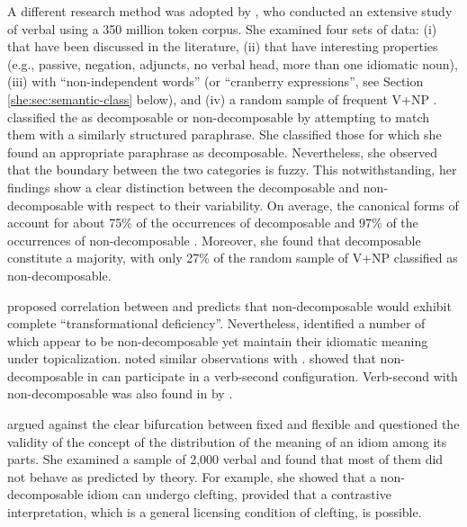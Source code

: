 \documentclass[output=paper]{langsci/langscibook}
\begin{document}
A different research method was adopted by \citet{riehemann01}, who conduct\-ed an extensive study of verbal  using
a 350 million token corpus. She examined four sets of data: (i) 
that have been discussed in the literature, (ii)  that have
interesting properties (e.g., passive, negation, adjuncts, no verbal
head, more than one idiomatic noun), (iii)  with ``non-independent words'' (or ``cranberry expressions'', see Section \ref{she:sec:semantic-class} below),
and (iv) a random sample of frequent V+NP . \citeauthor{riehemann01} classified the  as decomposable or non-decomposable by attempting to match them with a similarly structured paraphrase. She classified those for which she found an appropriate paraphrase as decomposable. Nevertheless, she observed that the boundary between the two categories is fuzzy. This notwithstanding, her findings show a clear distinction between the decomposable and non-decomposable  with respect to their variability.  On average, the canonical forms of  account
for about 75\% of the occurrences of decomposable  and 97\% of
the occurrences of non-decomposable . Moreover, she found that
decomposable  constitute a majority, with only 27\% of the
random sample of V+NP  classified as non-decomposable.


 proposed correlation between  and  predicts that
non-de\-com\-pos\-able  would exhibit complete ``transformational
deficiency''. Nevertheless, \citet{webelhuthackerman99} identified a
number of   which appear to be non-decomposable yet
maintain their idiomatic meaning under
topicalization. \citet{bargmannsailer15} noted similar observations with
.  \citet{schenk95} showed that non-de\-com\-pos\-able  in
 can participate in a verb-second configuration. Verb-second
with non-decomposable  was also found in  by
\citet{gregoire:2007:acl07-mwe}.

\citet{abeille95} argued against the clear bifurcation between fixed
and flexible  and questioned the validity of the concept of the
distribution of the meaning of an idiom among its parts. She examined
a sample of 2,000  verbal  and found that most of them
did not behave as predicted by  theory. For
example, she showed that a non-decomposable idiom can undergo clefting,
provided that a contrastive interpretation, which is a general
licensing condition of clefting, is possible.
\end{document}
